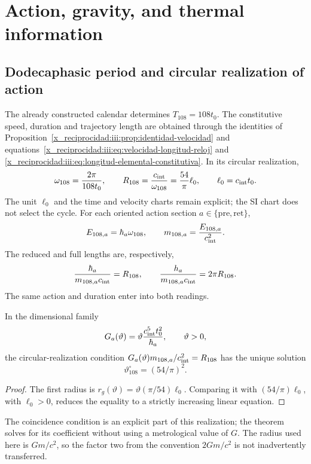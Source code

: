 

\chapter{Action, gravity, and thermal information}
\label{x_reciprocidad:v:ant:sec:gravity}
\section{Dodecaphasic period and circular realization of action}
The already constructed calendar determines $T_{108}=108t_0$.
The constitutive speed, duration and trajectory length are
obtained through the identities of
Proposition~\ref{x_reciprocidad:iii:prop:identidad-velocidad} and
equations~\eqref{x_reciprocidad:iii:eq:velocidad-longitud-reloj} and
\eqref{x_reciprocidad:iii:eq:longitud-elemental-constitutiva}.
In its circular realization,
\[
\omega_{108}=\frac{2\pi}{108t_0},\qquad
R_{108}=\frac{c_{\rm int}}{\omega_{108}}
=\frac{54}{\pi}\ell_0,\qquad \ell_0=c_{\rm int}t_0.
\]
The unit $\ell_0$ and the time and velocity charts remain
explicit; the SI chart does not select the cycle.
For each oriented action section $a\in\{\mathrm{pre},\mathrm{ret}\}$,
\[
E_{108,a}=\hbar_a\omega_{108},\qquad
m_{108,a}=\frac{E_{108,a}}{c_{\rm int}^2}.
\]
The reduced and full lengths are, respectively,
\[
\frac{\hbar_a}{m_{108,a}c_{\rm int}}=R_{108},
\qquad
\frac{h_a}{m_{108,a}c_{\rm int}}=2\pi R_{108}.
\]
The same action and duration enter into both readings.

\begin{proposition}
In the dimensional family
\[
G_a(\vartheta)=\vartheta\frac{c_{\rm int}^5t_0^2}{\hbar_a},
\qquad \vartheta>0,
\]
the circular-realization condition
$G_a(\vartheta)m_{108,a}/c_{\rm int}^2=R_{108}$
has the unique solution
\[
\vartheta^\circ_{108}=(54/\pi)^2.
\]
\end{proposition}
\begin{proof}
The first radius is
$r_g(\vartheta)=\vartheta(\pi/54)\ell_0$.
Comparing it with $(54/\pi)\ell_0$, with $\ell_0>0$, reduces the
equality to a strictly increasing linear equation.
\end{proof}
The coincidence condition is an explicit part of this realization;
the theorem solves for its coefficient without using a metrological value of $G$.
The radius used here is $Gm/c^2$, so the factor two from
the convention $2Gm/c^2$ is not inadvertently transferred.


